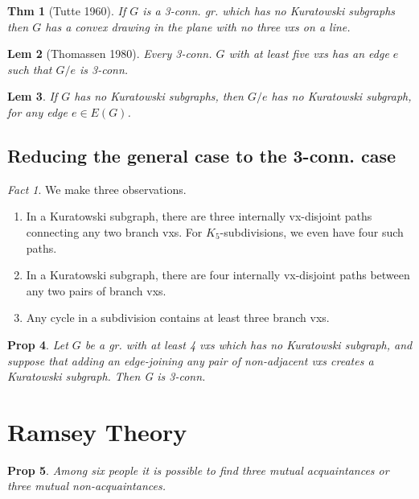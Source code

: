 \documentclass[11pt, fleqn, a4paper, landscape]{article}
\theoremstyle{plain} %
\newtheorem{thm}{Thm}
\newtheorem{lem}[thm]{Lem}
\newtheorem{pro}[thm]{Prop}
\theoremstyle{remark} %
\newtheorem{fact}{Fact}
\theoremstyle{definition} %
\newtheorem{defi}[thm]{Def}
\begin{document}
\begin{multicols}{5}
\begin{thm}[Tutte 1960]
If $G$ is a 3-conn. gr. which has no Kuratowski subgraphs then
$G$ has a convex drawing in the plane with no three vxs on a line.
\end{thm}

\begin{lem}[Thomassen 1980]
Every 3-conn. $G$ with at least five vxs has an edge
$e$ such that $G\slash e$ is 3-conn.
\end{lem}

\begin{lem}
If $G$ has no Kuratowski subgraphs, then $G\slash e$ has no Kuratowski subgraph, for any edge $e\in E(G)$.
\end{lem}

\subsection{Reducing the general case to the 3-conn. case}

\addtocounter{thm}{2}
\begin{fact}
We make three observations. 
\begin{enumerate}
\item  In a Kuratowski subgraph, there are three internally vx-disjoint paths connecting any two
branch vxs. For $K_5$-subdivisions, we even have four such paths.
\item In a Kuratowski subgraph, there are four internally vx-disjoint paths between any two pairs
of branch vxs.
\item Any cycle in a subdivision contains at least three branch vxs.
\end{enumerate}
\end{fact}

\begin{pro}
Let $G$ be a gr. with at least 4 vxs which has no Kuratowski subgraph, and suppose that adding an edge-joining any pair of non-adjacent vxs creates a Kuratowski subgraph.
Then G is 3-conn.
\end{pro}

\section{Ramsey Theory}

\begin{pro}
Among six people it is possible to find three mutual acquaintances or three mutual non-acquaintances.
\end{pro}


\end{multicols}
\end{document}
